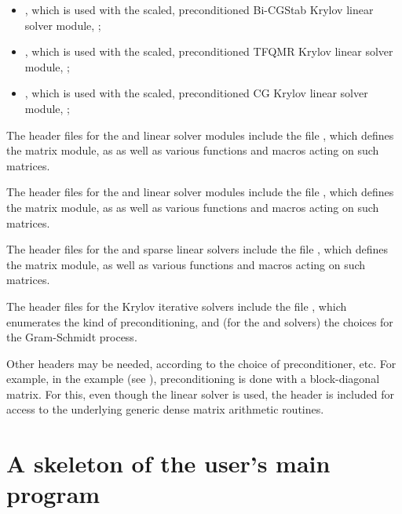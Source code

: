 \begin{itemize}
\begin{itemize}
  \item {},
    which is used with the scaled, preconditioned Bi-CGStab Krylov
    linear solver module, {\sunlinsolspbcgs};

  \item {},
    which is used with the scaled, preconditioned TFQMR Krylov linear
    solver module, {\sunlinsolsptfqmr};

  \item {},
    which is used with the scaled, preconditioned CG Krylov linear
    solver module, {\sunlinsolpcg};
  \end{itemize}
\end{itemize}

The header files for the {\sunlinsoldense} and {\sunlinsollapdense}
linear solver modules include the file
, which defines the {\sunmatdense}
matrix module, as as well as various functions and macros acting on
such matrices.

The header files for the {\sunlinsolband} and {\sunlinsollapband}
linear solver modules include the file
, which defines the {\sunmatband}
matrix module, as as well as various functions and macros acting on
such matrices.

The header files for the {\sunlinsolklu} and {\sunlinsolslumt}
sparse linear solvers include the file
, which defines the {\sunmatsparse}
matrix module, as well as various functions and macros acting on such
matrices.

The header files for the Krylov iterative solvers include the file
, which enumerates the kind of
preconditioning, and (for the {\spgmr} and {\spfgmr} solvers) the
choices for the Gram-Schmidt process.

Other headers may be needed, according to the choice of
preconditioner, etc.  For example, in the 
example (see \cite{kinsol_ex}), preconditioning is done with a
block-diagonal matrix. For this, even though the {\sunlinsolspgmr} linear
solver is used, the header  is included for
access to the underlying generic dense matrix arithmetic routines.

\section{A skeleton of the user's main program}\label{ss:skeleton_sol}

